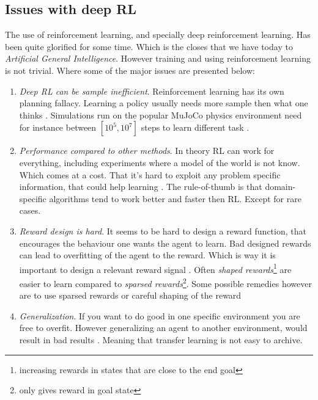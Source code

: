 \documentclass{kththesis}
\theoremstyle{definition}
\begin{document}

\newpage

\subsection{Issues with deep RL}
The use of reinforcement learning, and specially deep reinforcement learning. Has been quite glorified for some time. Which is the closes that we have today to \textit{Artificial General Intelligence}. However training and using reinforcement learning is not trivial. Where some of the major issues are presented below:

\begin{enumerate}
    \item \textit{Deep RL can be sample inefficient}. Reinforcement learning has its own planning fallacy. Learning a policy usually needs more sample then what one thinks \parencite{irpan_2018}. Simulations run on the popular MuJoCo physics environment need for instance between $[10^5, 10^7]$ steps to learn different task \parencite{heess2017emergence}.
    
    \item \textit{Performance compared to other methods}. In theory RL can work for everything, including experiments where a model of the world is not know. Which comes at a cost. That it's hard to exploit any problem specific information, that could help learning \parencite{irpan_2018}. The rule-of-thumb is that domain-specific algorithms tend to work better and faster then RL. Except for rare cases.
    
    \item \textit{Reward design is hard}. It seems to be hard to design a reward function, that encourages the behaviour one wants the agent to learn. Bad designed rewards can lead to overfitting of the agent to the reward. Which is way it is important to design a relevant reward signal \parencite{sutton1998reinforcement, irpan_2018}. Often \textit{shaped rewards}\footnote{increasing rewards in states that are close to the end goal} are easier to learn compared to \textit{sparsed rewards}\footnote{only gives reward in goal state}. Some possible remedies however are to use sparsed rewards or careful shaping of the reward \parencite{irpan_2018}
    
    \item \textit{Generalization}. If you want to do good in one specific environment you are free to overfit. However generalizing an agent to another environment, would result in bad results \parencite{irpan_2018}. Meaning that transfer learning is not easy to archive. 
    
\end{enumerate}
\end{document}
